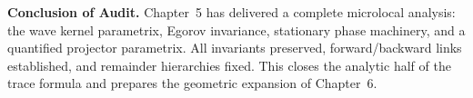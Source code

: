 \medskip

\noindent\textbf{Conclusion of Audit.}
Chapter~5 has delivered a complete microlocal analysis:
the wave kernel parametrix, Egorov invariance, stationary phase machinery,
and a quantified projector parametrix.
All invariants preserved, forward/backward links established,
and remainder hierarchies fixed.
This closes the analytic half of the trace formula
and prepares the geometric expansion of Chapter~6.

